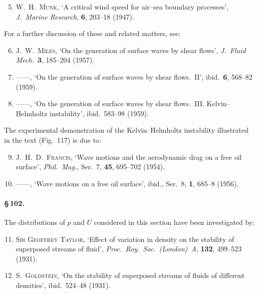 \begin{enumerate}\setcounter{enumi}{4}
\item W.~H.~\textsc{Munk}, `A critical wind speed for air--sea boundary processes',
  \emph{J.\ Marine Research}, \textbf{6}, 203--18 (1947).
\end{enumerate}

\noindent
For a further discussion of these and related matters, see:

\begin{enumerate}\setcounter{enumi}{5}
\item J.~W.~\textsc{Miles}, `On the generation of surface waves by shear flows',
  \emph{J.\ Fluid Mech.}\ \textbf{3}, 185--204 (1957).

\item ------,
  `On the generation of surface waves by shear flows.~II',
  ibid.\ \textbf{6}, 568--82 (1959).

\item ------,
  `On the generation of surface waves by shear flows.~III.
  Kelvin--Helmholtz instability', ibid.\ 583--98 (1959).
\end{enumerate}

\noindent
The experimental demonstration of the Kelvin--Helmholtz instability
illustrated in the text (Fig.~117) is due to:

\begin{enumerate}\setcounter{enumi}{8}
\item J.~H.~D.~\textsc{Francis}, `Wave motions and the aerodynamic drag on a free oil
  surface', \emph{Phil.\ Mag.}, Ser.~7, \textbf{45}, 695--702 (1954).

\item ------,
  `Wave motions on a free oil surface', ibid., Ser.~8, \textbf{1}, 685--8 (1956).
\end{enumerate}

\paragraph{\S\,102.}
The distributions of $p$ and $U$ considered in this section have been
investigated by:

\begin{enumerate}\setcounter{enumi}{10}
\item \textsc{Sir Geoffrey Taylor}, `Effect of variation in density on the
  stability of superposed streams of fluid',
  \emph{Proc.\ Roy.\ Soc.\ (London)~A}, \textbf{132}, 499--523 (1931).

\item S.~\textsc{Goldstein}, `On the stability of superposed streams of fluids of
  different densities', ibid.\ 524--48 (1931).
\end{enumerate}

